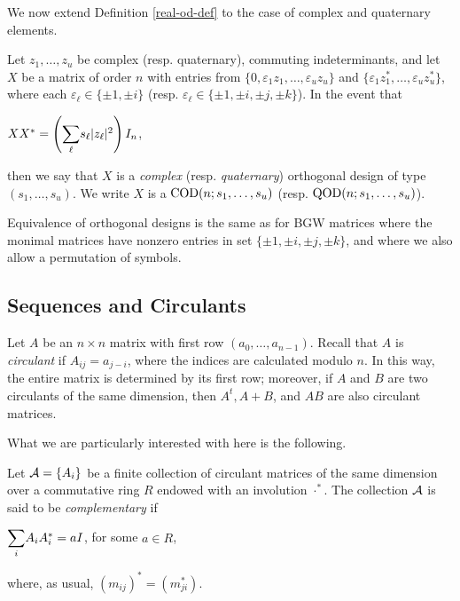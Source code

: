\documentclass[../../../main]{subfiles}
\begin{document}
We now extend Definition \ref{real-od-def} to the case of complex and quaternary elements.

\begin{defin}
  Let $z_1, \dots, z_u$ be complex (resp. quaternary), commuting indeterminants, and let $X$ be a matrix of order $n$ with entries from $\{0,\varepsilon_1z_1, \dots, \varepsilon_uz_u\}$ and $\{\varepsilon_1z_1^*, \dots, \varepsilon_uz_u^*\}$, where each $\varepsilon_\ell \in \{\pm 1, \pm i\}$ (resp. $\varepsilon_\ell \in \{\pm 1, \pm i, \pm j, \pm k\}$). In the event that
  \begin{defenum}
  \item\label{qod-od-def} $XX^* = \left( \ssum_\ell s_\ell|z_\ell|^2 \right)I_n$,
  \end{defenum}
  then we say that $X$ is a {\it complex} (resp. {\it quaternary}) orthogonal design of type $(s_1,\dots,s_u)$. We write $X$ is a $\text{COD}(n;s_1,\dots,s_u)$ (resp. $\text{QOD}(n;s_1,\dots,s_u)$).
\end{defin}

Equivalence of orthogonal designs is the same as for BGW matrices where the
monimal matrices have nonzero entries in set $\{\pm 1,\pm i,\pm j,\pm k\}$, and where we also
allow a permutation of symbols.

\dinkus


\subsection{Sequences and Circulants}

 Let $A$ be an $n \times n$ matrix with first row $(a_0,\dots,a_{n-1})$. Recall
 that $A$ is {\it circulant} if $A_{ij}=a_{j-i}$, where
 the indices are calculated modulo $n$. In this way, the entire matrix is
 determined by its first row; moreover, if $A$ and $B$ are two circulants of the
 same dimension, then $A^t,A+B$, and $AB$ are also circulant matrices. 

 What we are particularly interested with here is the following.
 
 \begin{defin}
  Let $\mathcal{A}=\{A_i\}$ be a finite collection of circulant matrices of the same dimension over a commutative ring $R$ endowed with an involution $\cdot^*$. The collection $\mathcal{A}$ is said to be {\it complementary} if
  \begin{defenum}
   \item $\ssum_i A_iA_i^* = aI$, for some $a \in R$,
  \end{defenum}
  where, as usual, $(m_{ij})^*=(m_{ji}^*)$.
 \end{defin}
 
\end{document}
